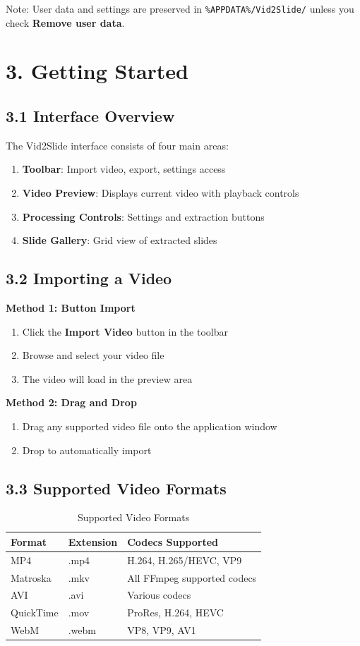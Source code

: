 \documentclass[12pt,a4paper]{article}
\newcommand{\sectionTitle}[1]{\section*{#1}}
\newcommand{\subsectionTitle}[1]{\subsection*{#1}}
\newcommand{\code}[1]{\texttt{#1}}
\begin{document}
Note: User data and settings are preserved in \code{\%APPDATA\%/Vid2Slide/} unless you check \textbf{Remove user data}.

\newpage

\sectionTitle{3. Getting Started}

\subsectionTitle{3.1 Interface Overview}

The Vid2Slide interface consists of four main areas:
\begin{enumerate}
    \item \textbf{Toolbar}: Import video, export, settings access
    \item \textbf{Video Preview}: Displays current video with playback controls
    \item \textbf{Processing Controls}: Settings and extraction buttons
    \item \textbf{Slide Gallery}: Grid view of extracted slides
\end{enumerate}

\subsectionTitle{3.2 Importing a Video}

\textbf{Method 1: Button Import}
\begin{enumerate}
    \item Click the \textbf{Import Video} button in the toolbar
    \item Browse and select your video file
    \item The video will load in the preview area
\end{enumerate}

\textbf{Method 2: Drag and Drop}
\begin{enumerate}
    \item Drag any supported video file onto the application window
    \item Drop to automatically import
\end{enumerate}

\subsectionTitle{3.3 Supported Video Formats}

\begin{table}[H]
    \centering
    \caption{Supported Video Formats}
    \begin{tabular}{llp{5cm}}
        \toprule
        \textbf{Format} & \textbf{Extension} & \textbf{Codecs Supported} \\
        \midrule
        MP4 & .mp4 & H.264, H.265/HEVC, VP9 \\
        Matroska & .mkv & All FFmpeg supported codecs \\
        AVI & .avi & Various codecs \\
        QuickTime & .mov & ProRes, H.264, HEVC \\
        WebM & .webm & VP8, VP9, AV1 \\
        \bottomrule
    \end{tabular}
\end{table}
\end{document}
